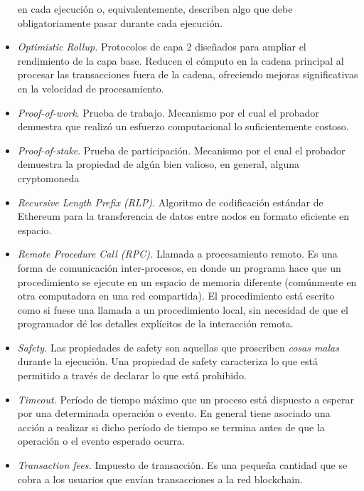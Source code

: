 \begin{itemize}
     en cada ejecución o, equivalentemente, describen algo que debe obligatoriamente pasar durante cada ejecución.
     \item \textit{Optimistic Rollup.} Protocolos de capa 2 diseñados para ampliar el rendimiento de la capa base.
     Reducen el cómputo en la cadena principal al procesar las transacciones fuera de la cadena, ofreciendo mejoras
     significativas en la velocidad de procesamiento.
     \item \textit{Proof-of-work}. Prueba de trabajo. Mecanismo por el cual el probador demuestra que
     realizó un esfuerzo computacional lo suficientemente costoso.
     \item \textit{Proof-of-stake}. Prueba de participación. Mecanismo por el cual el probador demuestra la propiedad de
     algún bien valioso, en general, alguna cryptomoneda
     \item \textit{Recursive Length Prefix (RLP).} Algoritmo de codificación estándar de Ethereum para la transferencia de datos
     entre nodos en formato eficiente en espacio.
     \item \textit{Remote Procedure Call (RPC).} Llamada a procesamiento remoto. Es una forma de comunicación inter-procesos,
     en donde un programa hace que un procedimiento se ejecute en un espacio de memoria diferente (comúnmente en otra computadora
     en una red compartida). El procedimiento  está escrito como si fuese una llamada a un procedimiento local, sin necesidad de
     que el programador dé los detalles explícitos de la interacción remota.
     \item \textit{Safety.} Las propiedades de safety son aquellas que proscriben \emph{cosas malas} durante
     la ejecución. Una propiedad de safety caracteriza lo que está permitido a través de declarar lo que está
     prohibido. 
     \item \textit{Timeout.} Período de tiempo máximo que un proceso está dispuesto a esperar por una determinada
     operación o evento. En general tiene asociado una acción a realizar si dicho período de tiempo se termina antes
     de que la operación o el evento esperado ocurra.
     \item \textit{Transaction fees.} Impuesto de transacción. Es una pequeña cantidad que se cobra a los
     usuarios que envían transacciones a la red blockchain.  
\end{itemize}